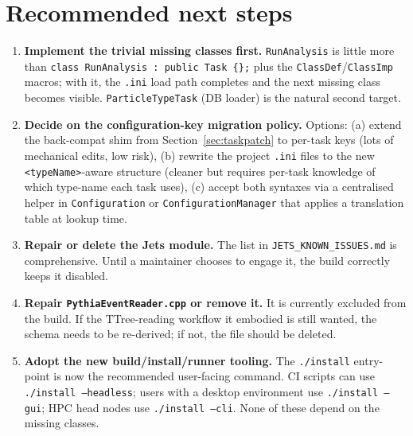 \documentclass[11pt,a4paper]{article}
\begin{document}
\section{Recommended next steps}

\begin{enumerate}[leftmargin=2em,itemsep=0.3em]
  \item \textbf{Implement the trivial missing classes first.} \texttt{RunAnalysis}
        is little more than \texttt{class RunAnalysis : public Task \{\};}
        plus the \texttt{ClassDef}/\texttt{ClassImp} macros; with it, the
        \texttt{.ini} load path completes and the next missing class
        becomes visible. \texttt{ParticleTypeTask} (DB loader) is the
        natural second target.

  \item \textbf{Decide on the configuration-key migration policy.} Options:
        (a) extend the back-compat shim from Section~\ref{sec:taskpatch}
        to per-task keys (lots of mechanical edits, low risk),
        (b) rewrite the project \texttt{.ini} files to the new
        \texttt{<typeName>}-aware structure (cleaner but requires
        per-task knowledge of which type-name each task uses),
        (c) accept both syntaxes via a centralised helper in
        \texttt{Configuration} or \texttt{ConfigurationManager} that
        applies a translation table at lookup time.

  \item \textbf{Repair or delete the Jets module.} The list in
        \texttt{JETS\_KNOWN\_ISSUES.md} is comprehensive. Until a maintainer
        chooses to engage it, the build correctly keeps it disabled.

  \item \textbf{Repair \texttt{PythiaEventReader.cpp} or remove it.} It is
        currently excluded from the build. If the TTree-reading workflow it
        embodied is still wanted, the schema needs to be re-derived; if
        not, the file should be deleted.

  \item \textbf{Adopt the new build/install/runner tooling.} The
        \texttt{./install} entry-point is now the recommended user-facing
        command. CI scripts can use \texttt{./install --headless}; users
        with a desktop environment use \texttt{./install --gui}; HPC head
        nodes use \texttt{./install --cli}. None of these depend on the
        missing classes.
\end{enumerate}
\end{document}

